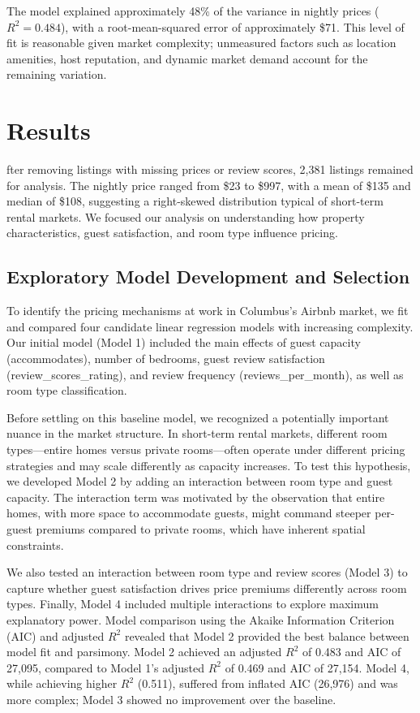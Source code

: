 \documentclass[9pt,a4paper,onecolumn,twoside]{tau-class/tau}
\begin{document}
The model explained approximately 48\% of the variance in nightly prices ($R^2 = 0.484$), with a root-mean-squared error of approximately \$71. This level of fit is reasonable given market complexity; unmeasured factors such as location amenities, host reputation, and dynamic market demand account for the remaining variation.


\section{Results}

fter removing listings with missing prices or review scores, 2,381 listings remained for analysis. The nightly price ranged from \$23 to \$997, with a mean of \$135 and median of \$108, suggesting a right-skewed distribution typical of short-term rental markets. We focused our analysis on understanding how property characteristics, guest satisfaction, and room type influence pricing.

\subsection{Exploratory Model Development and Selection}

To identify the pricing mechanisms at work in Columbus's Airbnb market, we fit and compared four candidate linear regression models with increasing complexity. Our initial model (Model 1) included the main effects of guest capacity (accommodates), number of bedrooms, guest review satisfaction (review\_scores\_rating), and review frequency (reviews\_per\_month), as well as room type classification.

Before settling on this baseline model, we recognized a potentially important nuance in the market structure. In short-term rental markets, different room types---entire homes versus private rooms---often operate under different pricing strategies and may scale differently as capacity increases. To test this hypothesis, we developed Model 2 by adding an interaction between room type and guest capacity. The interaction term was motivated by the observation that entire homes, with more space to accommodate guests, might command steeper per-guest premiums compared to private rooms, which have inherent spatial constraints.

We also tested an interaction between room type and review scores (Model 3) to capture whether guest satisfaction drives price premiums differently across room types. Finally, Model 4 included multiple interactions to explore maximum explanatory power. Model comparison using the Akaike Information Criterion (AIC) and adjusted $R^2$ revealed that Model 2 provided the best balance between model fit and parsimony. Model 2 achieved an adjusted $R^2$ of 0.483 and AIC of 27,095, compared to Model 1's adjusted $R^2$ of 0.469 and AIC of 27,154. Model 4, while achieving higher $R^2$ (0.511), suffered from inflated AIC (26,976) and was more complex; Model 3 showed no improvement over the baseline.
\end{document}
